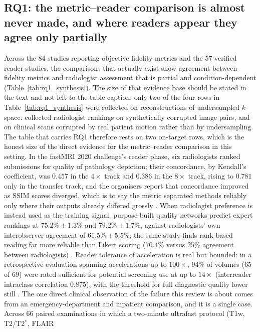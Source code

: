 \documentclass[review,authoryear]{elsarticle}
\begin{document}
\subsection{RQ1: the metric--reader comparison is almost never made, and where readers appear they agree only partially}
Across the 84 studies reporting objective fidelity metrics and the 57 verified reader studies,
the comparisons that actually exist show agreement between fidelity metrics and
radiologist assessment that is partial and condition-dependent
(Table~\ref{tab:rq1_synthesis}). The size of that evidence base should be stated in the
text and not left to the table caption: only two of the four rows in
Table~\ref{tab:rq1_synthesis} were collected on reconstructions of undersampled
$k$-space. \citet{tang2025incorporating} collected radiologist rankings on synthetically
corrupted image pairs, and \citet{sommer2020correction} on clinical scans corrupted by
real patient motion rather than by undersampling. The table that carries RQ1 therefore
rests on two on-target rows, which is the honest size of the direct evidence for the
metric--reader comparison in this setting. In the fastMRI 2020 challenge's reader phase, six
radiologists ranked submissions for quality of pathology depiction; their concordance,
by Kendall's coefficient, was $0.457$ in the $4\times$ track and $0.386$ in the
$8\times$ track, rising to $0.781$ only in the transfer track, and the organisers
report that concordance improved as SSIM scores diverged, which is to say the metric
separated methods reliably only where their outputs already differed grossly
\citep{muckley2021results}. When radiologist preference is instead used as the training
signal, purpose-built quality networks predict expert rankings at $75.2\%\pm1.3\%$ and
$79.2\%\pm1.7\%$, against radiologists' own interobserver agreement of
$61.5\%\pm5.5\%$; the same study finds rank-based reading far more reliable than Likert
scoring ($70.4\%$ versus $25\%$ agreement between radiologists)
\citep{tang2025incorporating}. Reader tolerance of acceleration is real but bounded: in
a retrospective evaluation spanning accelerations up to $100\times$, $94\%$ of volumes
($65$ of $69$) were rated sufficient for potential screening use at up to $14\times$
(interreader intraclass correlation $0.875$), with the threshold for full diagnostic
quality lower still \citep{radmanesh2022exploring}. The one direct clinical observation of the failure this review is about comes from an
emergency-department and inpatient comparison, and it is a single case. Across $66$
paired examinations in which a two-minute ultrafast protocol (T1w, T2/T2$^{*}$, FLAIR
\end{document}
